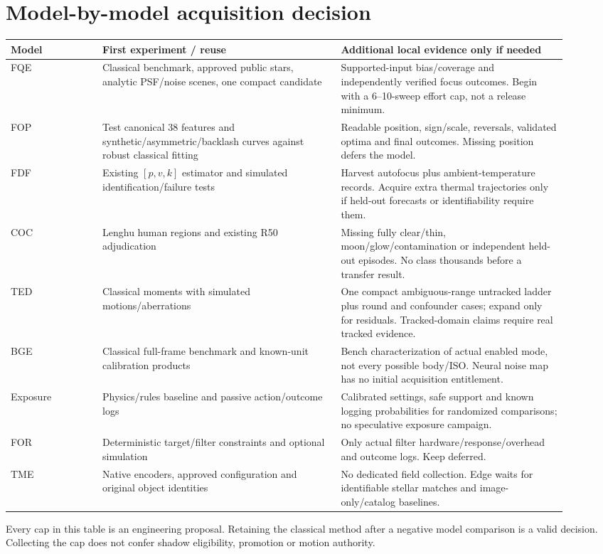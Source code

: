 \documentclass[11pt,a4paper]{article}
\begin{document}
\section{Model-by-model acquisition decision}
\begin{longtable}{@{}L{0.15\linewidth}L{0.39\linewidth}L{0.37\linewidth}@{}}
\toprule Model & First experiment / reuse & Additional local evidence only if needed\\\midrule\endhead
FQE & Classical benchmark, approved public stars, analytic PSF/noise scenes,
one compact candidate & Supported-input bias/coverage and independently
verified focus outcomes. Begin with a 6--10-sweep effort cap, not a release minimum.\\
FOP & Test canonical 38 features and synthetic/asymmetric/backlash curves
against robust classical fitting & Readable position, sign/scale, reversals,
validated optima and final outcomes. Missing position defers the model.\\
FDF & Existing $[p,v,k]$ estimator and simulated identification/failure tests &
Harvest autofocus plus ambient-temperature records. Acquire extra thermal
trajectories only if held-out forecasts or identifiability require them.\\
COC & Lenghu human regions and existing R50 adjudication & Missing fully
clear/thin, moon/glow/contamination or independent held-out episodes. No class
thousands before a transfer result.\\
TED & Classical moments with simulated motions/aberrations & One compact
ambiguous-range untracked ladder plus round and confounder cases; expand only
for residuals. Tracked-domain claims require real tracked evidence.\\
BGE & Classical full-frame benchmark and known-unit calibration products &
Bench characterization of actual enabled mode, not every possible body/ISO.
Neural noise map has no initial acquisition entitlement.\\
Exposure & Physics/rules baseline and passive action/outcome logs & Calibrated
settings, safe support and known logging probabilities for randomized
comparisons; no speculative exposure campaign.\\
FOR & Deterministic target/filter constraints and optional simulation & Only
actual filter hardware/response/overhead and outcome logs. Keep deferred.\\
TME & Native encoders, approved configuration and original object identities &
No dedicated field collection. Edge waits for identifiable stellar matches and
image-only/catalog baselines.\\
\bottomrule
\end{longtable}
Every cap in this table is an engineering proposal. Retaining the classical
method after a negative model comparison is a valid decision. Collecting the
cap does not confer shadow eligibility, promotion or motion authority.
\end{document}
